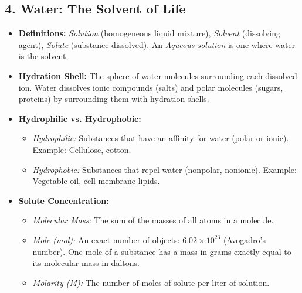 \documentclass[11pt, a4paper]{article}
\begin{document}
\subsection*{4. Water: The Solvent of Life}
\begin{itemize}
    \item \textbf{Definitions:} \textit{Solution} (homogeneous liquid mixture), \textit{Solvent} (dissolving agent), \textit{Solute} (substance dissolved). An \textit{Aqueous solution} is one where water is the solvent.
    \item \textbf{Hydration Shell:} The sphere of water molecules surrounding each dissolved ion. Water dissolves ionic compounds (salts) and polar molecules (sugars, proteins) by surrounding them with hydration shells.
    \item \textbf{Hydrophilic vs. Hydrophobic:}
    \begin{itemize}
        \item \textit{Hydrophilic:} Substances that have an affinity for water (polar or ionic). Example: Cellulose, cotton.
        \item \textit{Hydrophobic:} Substances that repel water (nonpolar, nonionic). Example: Vegetable oil, cell membrane lipids.
    \end{itemize}
    \item \textbf{Solute Concentration:} 
    \begin{itemize}
        \item \textit{Molecular Mass:} The sum of the masses of all atoms in a molecule.
        \item \textit{Mole (mol):} An exact number of objects: $6.02 \times 10^{23}$ (Avogadro's number). One mole of a substance has a mass in grams exactly equal to its molecular mass in daltons.
        \item \textit{Molarity (M):} The number of moles of solute per liter of solution.
    \end{itemize}
\end{itemize}
\end{document}

